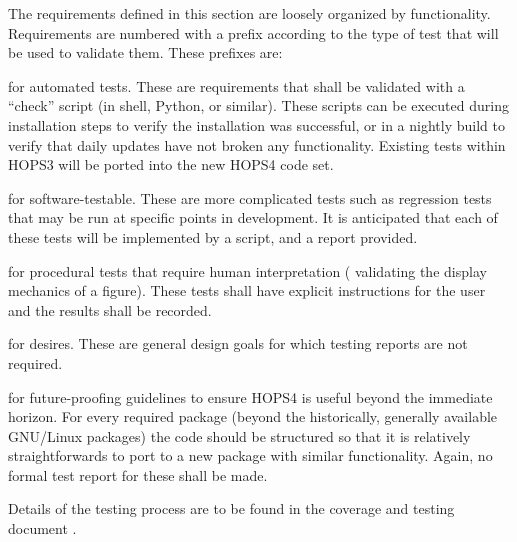 The requirements defined in this section are loosely organized by functionality.
Requirements are numbered with a prefix according to
the type of test that will be used to validate them.  These prefixes are:
\begin{description}
[align=left, labelwidth=0.0cm, leftmargin=1cm]
\item[A,] for automated tests. These are requirements
that shall be validated with a ``check'' script (in shell, Python, or similar).
These scripts can be executed during installation steps to verify the
installation was successful,
or in a nightly build to verify that daily updates have not broken any
functionality. Existing tests within HOPS3 will be ported into the new
HOPS4 code set.

\item[S,] for software-testable. These are more complicated tests such as
regression tests that may be run at specific points in development. It is
anticipated that each of these tests will be implemented by a script, and a report provided.

\item[P,] for procedural tests that require human interpretation (\eg
validating the display mechanics of a figure). These tests shall have
explicit instructions for the user and the results shall be recorded.

\item[D,] for desires. These are general design goals for which testing reports are not required.

\item[F,] for future-proofing guidelines to ensure HOPS4 is useful beyond
the immediate horizon. For every required package (beyond the historically,
generally available GNU/Linux packages) the code should be structured
so that it is relatively straightforwards to port to a new package with
similar functionality. Again, no formal test report for these shall be made.

\end{description}

Details of the testing process are to be found in the coverage
and testing document \cite{cover}.





